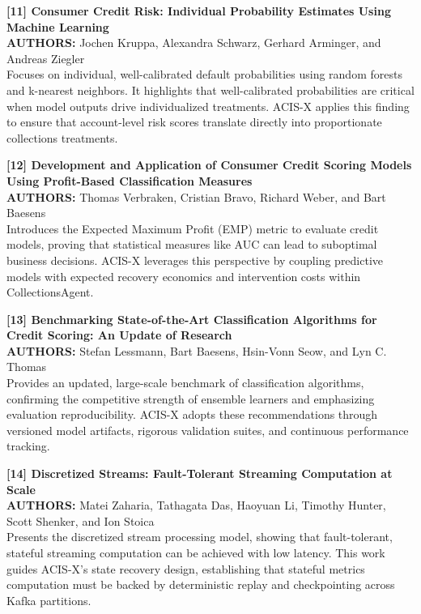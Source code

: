 \documentclass[a4paper, 12pt]{report}
\begin{document}
\noindent \textbf{[11] Consumer Credit Risk: Individual Probability Estimates Using Machine Learning}\\
\textbf{AUTHORS:} Jochen Kruppa, Alexandra Schwarz, Gerhard Arminger, and Andreas Ziegler\\
Focuses on individual, well-calibrated default probabilities using random forests and k-nearest neighbors. It highlights that well-calibrated probabilities are critical when model outputs drive individualized treatments. ACIS-X applies this finding to ensure that account-level risk scores translate directly into proportionate collections treatments.

\noindent \textbf{[12] Development and Application of Consumer Credit Scoring Models Using Profit-Based Classification Measures}\\
\textbf{AUTHORS:} Thomas Verbraken, Cristian Bravo, Richard Weber, and Bart Baesens\\
Introduces the Expected Maximum Profit (EMP) metric to evaluate credit models, proving that statistical measures like AUC can lead to suboptimal business decisions. ACIS-X leverages this perspective by coupling predictive models with expected recovery economics and intervention costs within CollectionsAgent.

\noindent \textbf{[13] Benchmarking State-of-the-Art Classification Algorithms for Credit Scoring: An Update of Research}\\
\textbf{AUTHORS:} Stefan Lessmann, Bart Baesens, Hsin-Vonn Seow, and Lyn C. Thomas\\
Provides an updated, large-scale benchmark of classification algorithms, confirming the competitive strength of ensemble learners and emphasizing evaluation reproducibility. ACIS-X adopts these recommendations through versioned model artifacts, rigorous validation suites, and continuous performance tracking.

\noindent \textbf{[14] Discretized Streams: Fault-Tolerant Streaming Computation at Scale}\\
\textbf{AUTHORS:} Matei Zaharia, Tathagata Das, Haoyuan Li, Timothy Hunter, Scott Shenker, and Ion Stoica\\
Presents the discretized stream processing model, showing that fault-tolerant, stateful streaming computation can be achieved with low latency. This work guides ACIS-X's state recovery design, establishing that stateful metrics computation must be backed by deterministic replay and checkpointing across Kafka partitions.
\end{document}
